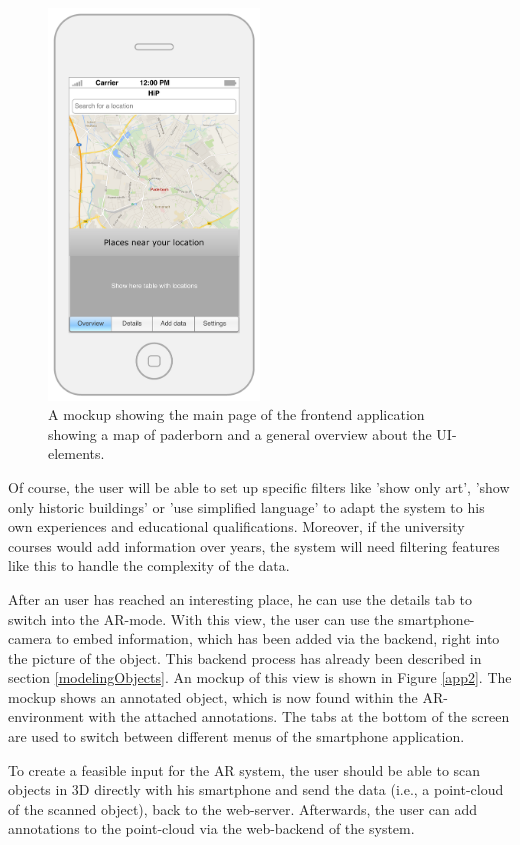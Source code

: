 \begin{figure}[th]
\centerline{\includegraphics[width=0.5\textwidth]{gfx/mockup_app_1}}
\caption{A mockup showing the main page of the frontend application showing a map of paderborn and a general overview about the UI-elements.}
\label{app1}
\end{figure}

Of course, the user will be able to set up specific filters like 'show only art', 'show only historic buildings' or 'use simplified language' to adapt the system to his own experiences and educational qualifications. Moreover, if the university courses would add information over years, the system will need filtering features like this to handle the complexity of the data.

After an user has reached an interesting place, he can use the details tab to switch into the \ac{AR}-mode. With this view, the user can use the smartphone-camera to embed information, which has been added via the backend, right into the picture of the object. This backend process has already been described in section \ref{modelingObjects}. An mockup of this view is shown in Figure \ref{app2}. The mockup shows an annotated object, which is now found within the \ac{AR}-environment with the attached annotations. The tabs at the bottom of the screen are used to switch between different menus of the smartphone application. 

To create a feasible input for the \ac{AR} system, the user should be able to scan objects in 3D directly with his smartphone and send the data (i.e., a point-cloud of the scanned object), back to the web-server.  Afterwards, the user can add annotations to the point-cloud via the web-backend of the system. 

